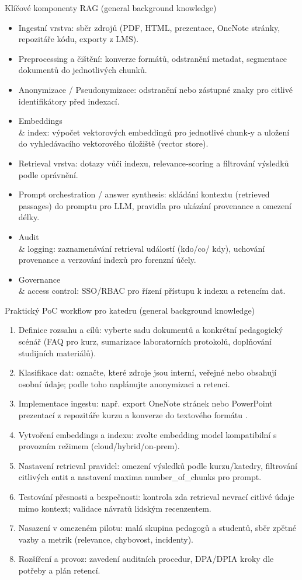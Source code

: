 \documentclass{report}%
\begin{document}
Klíčové komponenty RAG (general background knowledge)
\begin{itemize}
  \item Ingestní vrstva: sběr zdrojů (PDF, HTML, prezentace, OneNote stránky, repozitáře kódu, exporty z LMS).
  \item Preprocessing a čištění: konverze formátů, odstranění metadat, segmentace dokumentů do jednotlivých chunků.
  \item Anonymizace / Pseudonymizace: odstranění nebo zástupné znaky pro citlivé identifikátory před indexací.
  \item Embeddings \\ \& index: výpočet vektorových embeddingů pro jednotlivé chunk‑y a uložení do vyhledávacího vektorového úložiště (vector store).
  \item Retrieval vrstva: dotazy vůči indexu, relevance‑scoring a filtrování výsledků podle oprávnění.
  \item Prompt orchestration / answer synthesis: skládání kontextu (retrieved passages) do promptu pro LLM, pravidla pro ukázání provenance a omezení délky.
  \item Audit \\ \& logging: zaznamenávání retrieval událostí (kdo/co/ kdy), uchování provenance a verzování indexů pro forenzní účely.
  \item Governance \\ \& access control: SSO/RBAC pro řízení přístupu k indexu a retencím dat.
\end{itemize}

Praktický PoC workflow pro katedru (general background knowledge)
\begin{enumerate}
  \item Definice rozsahu a cílů: vyberte sadu dokumentů a konkrétní pedagogický scénář (FAQ pro kurz, sumarizace laboratorních protokolů, doplňování studijních materiálů).
  \item Klasifikace dat: označte, které zdroje jsou interní, veřejné nebo obsahují osobní údaje; podle toho naplánujte anonymizaci a retenci.
  \item Implementace ingestu: např. export OneNote stránek nebo PowerPoint prezentací z repozitáře kurzu a konverze do textového formátu \cite{kb_ai_101_tipu_pdf_04e4a115_page_8_1, kb_ai_101_tipu_pdf_04e4a115_page_44_2}.
  \item Vytvoření embeddings a indexu: zvolte embedding model kompatibilní s provozním režimem (cloud/hybrid/on‑prem).
  \item Nastavení retrieval pravidel: omezení výsledků podle kurzu/katedry, filtrování citlivých entit a nastavení maxima number_of_chunks pro prompt.
  \item Testování přesnosti a bezpečnosti: kontrola zda retrieval nevrací citlivé údaje mimo kontext; validace návratů lidským recenzentem.
  \item Nasazení v omezeném pilotu: malá skupina pedagogů a studentů, sběr zpětné vazby a metrik (relevance, chybovost, incidenty).
  \item Rozšíření a provoz: zavedení auditních procedur, DPA/DPIA kroky dle potřeby a plán retencí.
\end{enumerate}
\end{document}
